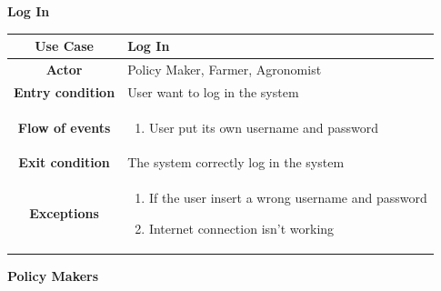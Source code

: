\documentclass[table, 12pt]{article}
\begin{document}
\begin{itemize}
            
            \begin{table}[H]
                \item[] \textbf{Log In}
                \item[]  
                \centering
                \begin{tabular}{c m{}}
                    \hline
                    \textbf{Use Case} & Log In\\ \hline
                    \textbf{Actor} & Policy Maker, Farmer, Agronomist\\ \hline
                    \textbf{Entry condition} & User want to log in the system\\  \hline
                    \textbf{Flow of events} & \begin{enumerate}
                                                \item User put its own username and password
                                            \end{enumerate}\\ \hline
                    \textbf{Exit condition} & The system correctly log in the system\\ \hline
                    \textbf{Exceptions} &  \begin{enumerate}
                        \item If the user insert a wrong username and password
                        \item Internet connection isn't working
                    \end{enumerate}\\ \hline                    
                \end{tabular}
            \end{table}

            \item \textbf{Policy Makers}
            

\end{itemize}
\end{document}
